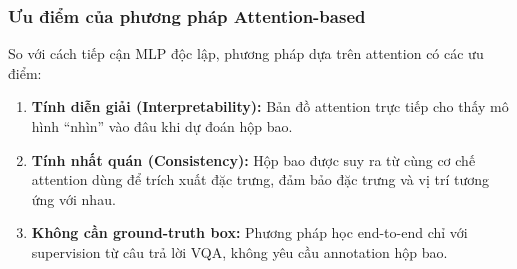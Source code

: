 \subsubsection{Ưu điểm của phương pháp Attention-based}

So với cách tiếp cận MLP độc lập, phương pháp dựa trên attention có các ưu điểm:
\begin{enumerate}
    \item \textbf{Tính diễn giải (Interpretability):} Bản đồ attention trực tiếp cho thấy mô hình ``nhìn'' vào đâu khi dự đoán hộp bao.
    \item \textbf{Tính nhất quán (Consistency):} Hộp bao được suy ra từ cùng cơ chế attention dùng để trích xuất đặc trưng, đảm bảo đặc trưng và vị trí tương ứng với nhau.
    \item \textbf{Không cần ground-truth box:} Phương pháp học end-to-end chỉ với supervision từ câu trả lời VQA, không yêu cầu annotation hộp bao.
\end{enumerate}
